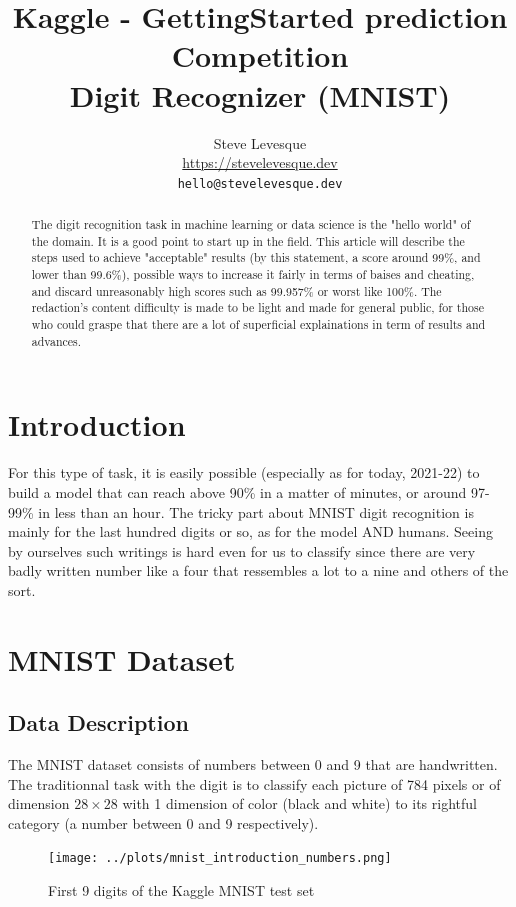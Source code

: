 \documentclass{article}
\title{
  Kaggle - GettingStarted prediction Competition \\ 
  Digit Recognizer (MNIST)
}
\author{%
  Steve Levesque \\
  \url{https://stevelevesque.dev} \\
  \texttt{hello@stevelevesque.dev}
}
\begin{document}
\maketitle

\begin{abstract}
  The digit recognition task in machine learning or data science is the "hello
  world" of the domain. It is a good point to start up in the field. This
  article will describe the steps used to achieve "acceptable" results (by this
  statement, a score around 99\%, and lower than 99.6\%), possible ways to 
  increase it fairly in terms of baises and cheating, and discard unreasonably
  high scores such as 99.957\% or worst like 100\%. The redaction's content 
  difficulty is made to be light and made for general public, for those who 
  could graspe that there are a lot of superficial explainations in term of
  results and advances.
\end{abstract}

\section{Introduction}
For this type of task, it is easily possible (especially as for today, 2021-22)
to build a model that can reach above 90\% in a matter of minutes, or around
97-99\% in less than an hour. The tricky part about MNIST digit recognition is
mainly for the last hundred digits or so, as for the model AND humans. Seeing
by ourselves such writings is hard even for us to classify since there are very
badly written number like a four that ressembles a lot to a nine and others of
the sort.

\section{MNIST Dataset}
\subsection{Data Description}
The MNIST dataset consists of numbers between 0 and 9 that are handwritten. The
traditionnal task with the digit is to classify each picture of 784 pixels or
of dimension $28 \times 28$ with 1 dimension of color (black and white) to its
rightful category (a number between 0 and 9 respectively).

\begin{figure}[!htbp]
  \centering
  \texttt{[image: ../plots/mnist\_introduction\_numbers.png]}
  \caption{First 9 digits of the Kaggle MNIST test set}
\end{figure}
\end{document}
